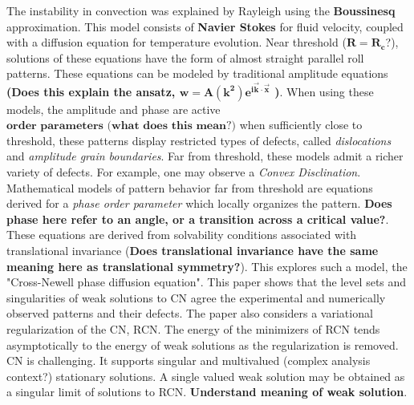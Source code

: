 \documentclass[12pt]{article}
\newcounter{solution}
\begin{document}
\hspace*{10mm} The instability in convection was explained by Rayleigh using the \textbf{Boussinesq} approximation. This model consists of \textbf{Navier Stokes} for fluid velocity, coupled with a diffusion equation for temperature evolution. Near threshold ($\mathbf{R=R_c}$?), solutions of these equations have the form of almost straight parallel roll patterns. These equations can be modeled by traditional amplitude equations \textbf{(Does this explain the ansatz, $\mathbf{w=A(k^2)e^{i\vec{k}\cdot\vec{x}}}$ \textbf{)}}. When using these models, the amplitude and phase are active $\textbf{order parameters (what does this mean?)}$ when sufficiently close to threshold, these patterns display restricted types of defects, called \emph{dislocations} and \emph{amplitude grain boundaries}.\newline
\hspace*{10mm} Far from threshold, these models admit a richer variety of defects. For example, one may observe a \emph{Convex Disclination}. \newline
\hspace*{10mm} Mathematical models of pattern behavior far from threshold are equations derived for a \emph{phase order parameter} which locally organizes the pattern. \textbf{Does phase here refer to an angle, or a transition across a critical value?}. These equations are derived from solvability conditions associated with translational invariance (\textbf{Does translational invariance have the same meaning here as translational symmetry?}). This explores such a model, the "Cross-Newell phase diffusion equation". This paper shows that the level sets and singularities of weak solutions to CN agree the experimental and numerically observed patterns and their defects. The paper also considers a variational regularization of the CN, RCN. The energy of the minimizers of RCN tends asymptotically to the energy of weak solutions as the regularization is removed.\newline
\hspace*{10mm} CN is challenging. It supports singular and multivalued (complex analysis context?) stationary solutions. A single valued weak solution may be obtained as a singular limit of solutions to RCN. \textbf{Understand meaning of weak solution}. \newline
\end{document}
